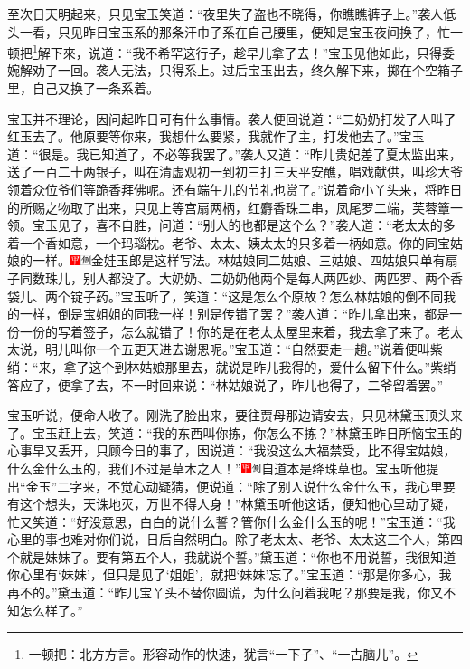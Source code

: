至次日天明起来，只见宝玉笑道：“夜里失了盗也不晓得，你瞧瞧裤子上。”袭人低头一看，只见昨日宝玉系的那条汗巾子系在自己腰里，便知是宝玉夜间换了，忙一顿把\footnote{一顿把：北方方言。形容动作的快速，犹言“一下子”、“一古脑儿”。}解下來，说道：“我不希罕这行子，趁早儿拿了去！”宝玉见他如此，只得委婉解劝了一回。袭人无法，只得系上。过后宝玉出去，终久解下来，掷在个空箱子里，自己又换了一条系着。

宝玉并不理论，因问起昨日可有什么事情。袭人便回说道：“二奶奶打发了人叫了红玉去了。他原要等你来，我想什么要紧，我就作了主，打发他去了。”宝玉道：“很是。我已知道了，不必等我罢了。”袭人又道：“昨儿贵妃差了夏太监出来，送了一百二十两银子，叫在清虚观初一到初三打三天平安醮，唱戏献供，叫珍大爷领着众位爷们等跪香拜佛呢。还有端午儿的节礼也赏了。”说着命小丫头来，将昨日的所赐之物取了出来，只见上等宫扇两柄，红麝香珠二串，凤尾罗二端，芙蓉簟一领。宝玉见了，喜不自胜，问道：“别人的也都是这个么？”袭人道：“老太太的多着一个香如意，一个玛瑙枕。老爷、太太、姨太太的只多着一柄如意。你的同宝姑娘的一样。{\includegraphics[width=3mm]{../Images/00002}\includegraphics[width=3mm]{../Images/00011}\footnotesize \kaishu 金娃玉郎是这样写法。}林姑娘同二姑娘、三姑娘、四姑娘只单有扇子同数珠儿，别人都没了。大奶奶、二奶奶他两个是每人两匹纱、两匹罗、两个香袋儿、两个锭子药。”宝玉听了，笑道：“这是怎么个原故？怎么林姑娘的倒不同我的一样，倒是宝姐姐的同我一样！别是传错了罢？”袭人道：“昨儿拿出来，都是一份一份的写着签子，怎么就错了！你的是在老太太屋里来着，我去拿了来了。老太太说，明儿叫你一个五更天进去谢恩呢。”宝玉道：“自然要走一趟。”说着便叫紫绡：“来，拿了这个到林姑娘那里去，就说是昨儿我得的，爱什么留下什么。”紫绡答应了，便拿了去，不一时回来说：“林姑娘说了，昨儿也得了，二爷留着罢。”

宝玉听说，便命人收了。刚洗了脸出来，要往贾母那边请安去，只见林黛玉顶头来了。宝玉赶上去，笑道：“我的东西叫你拣，你怎么不拣？”林黛玉昨日所恼宝玉的心事早又丢开，只顾今日的事了，因说道：“我没这么大福禁受，比不得宝姑娘，什么金什么玉的，我们不过是草木之人！”{\includegraphics[width=3mm]{../Images/00002}\includegraphics[width=3mm]{../Images/00011}\footnotesize \kaishu 自道本是绛珠草也。}宝玉听他提出“金玉”二字来，不觉心动疑猜，便说道：“除了别人说什么金什么玉，我心里要有这个想头，天诛地灭，万世不得人身！”林黛玉听他这话，便知他心里动了疑，忙又笑道：“好没意思，白白的说什么誓？管你什么金什么玉的呢！”宝玉道：“我心里的事也难对你们说，日后自然明白。除了老太太、老爷、太太这三个人，第四个就是妹妹了。要有第五个人，我就说个誓。”黛玉道：“你也不用说誓，我很知道你心里有‘妹妹’，但只是见了‘姐姐’，就把‘妹妹’忘了。”宝玉道：“那是你多心，我再不的。”黛玉道：“昨儿宝丫头不替你圆谎，为什么问着我呢？那要是我，你又不知怎么样了。”

